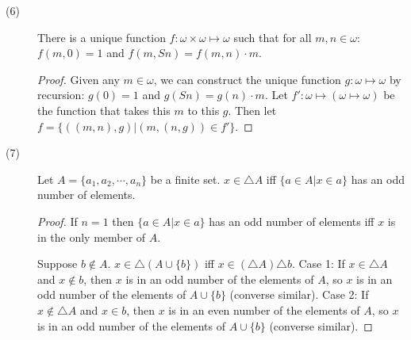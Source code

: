 \documentclass[12pt]{article}
\begin{document}
\begin{description}
\item[(6)] There is a unique function $f:\omega \times \omega \mapsto
\omega$ such that for all $m,n \in \omega$: $f(m,0) = 1$ and
$f(m,Sn)=f(m,n) \cdot m$.
  \begin{proof}
	Given any $m \in \omega$, we can construct the unique function $g:
	\omega \mapsto \omega$ by recursion: $g(0) = 1$ and $g(Sn) = g(n)
	\cdot m$.  Let $f': \omega \mapsto (\omega \mapsto \omega)$ be the
	function that takes this $m$ to this $g$.  Then let $f = \{((m,n),g)
	| (m,(n,g)) \in f'\}$.
  \end{proof}

	

\item[(7)] Let $A = \{a_1,a_2,\cdots,a_n\}$ be a finite set.  $x \in
\triangle A$ iff $\{ a \in A | x \in a \}$ has an odd number of
elements.
  \begin{proof}
    If $n = 1$ then $\{ a \in A | x \in a \}$ has an odd number of
	elements iff $x$ is in the only member of $A$.

	Suppose $b \not\in A$. $x \in \triangle(A \cup \{b\})$ iff $x \in
	(\triangle A) \triangle b$.  Case 1: If $x \in \triangle A$ and $x
	\not\in b$, then $x$ is in an odd number of the elements of $A$, so
	$x$ is in an odd number of the elements of $A \cup \{b\}$  (converse
	similar).  Case 2: If $x \not\in \triangle A$ and $x \in b$, then
	$x$ is in an even number of the elements of $A$, so $x$ is in an odd
	number of the elements of $A \cup \{b\}$ (converse similar).
  \end{proof}
\end{description}
\end{document}
